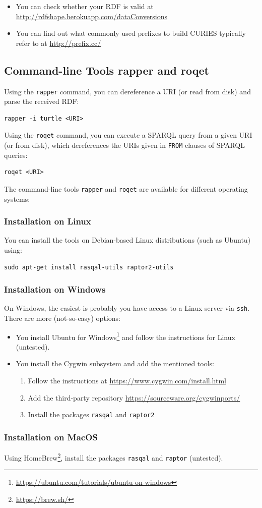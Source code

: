 \documentclass[DIV=12]{scrartcl}
\begin{document}
\begin{itemize}
\item You can check whether your RDF is valid at \url{http://rdfshape.herokuapp.com/dataConversions}
\item You can find out what commonly used prefixes to build CURIES typically refer to at \url{http://prefix.cc/}
\end{itemize}

\subsection*{Command-line Tools rapper and roqet}

Using the \texttt{rapper} command, you can dereference a URI (or read from disk) and parse the received RDF:
\begin{verbatim}
rapper -i turtle <URI>
\end{verbatim}
Using the \texttt{roqet} command, you can execute a SPARQL query from a given URI (or from disk), which dereferences the URIs given in \texttt{FROM} clauses of SPARQL queries:
\begin{verbatim}
roqet <URI>
\end{verbatim}
The command-line tools \texttt{rapper} and \texttt{roqet} are available for different operating systems:

\subsubsection*{Installation on Linux}
You can install the tools on Debian-based Linux distributions (such as Ubuntu) using:
\begin{verbatim}
sudo apt-get install rasqal-utils raptor2-utils
\end{verbatim}


\subsubsection*{Installation on Windows}

On Windows, the easiest is probably you have access to a Linux server via \verb|ssh|.
There are more (not-so-easy) options:
\begin{itemize}
\item You install Ubuntu for Windows\footnote{\url{https://ubuntu.com/tutorials/ubuntu-on-windows}} and follow the instructions for Linux (untested).
\item You install the Cygwin subsystem and add the mentioned tools:
\begin{enumerate}
\item Follow the instructions at \url{https://www.cygwin.com/install.html}
\item Add the third-party repository \url{https://sourceware.org/cygwinports/}
\item Install the packages \verb|rasqal| and \verb|raptor2|
\end{enumerate}
\end{itemize}

\subsubsection*{Installation on MacOS}

Using HomeBrew\footnote{\url{https://brew.sh/}}, install the packages \verb|rasqal| and \verb|raptor| (untested).
\end{document}
